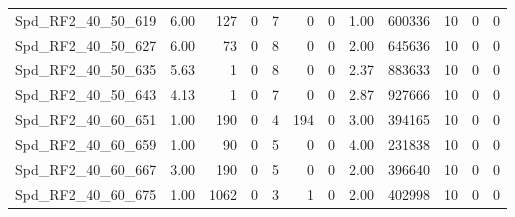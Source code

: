\begin{longtable}[c]{@{}lrrrrrrrrrrr@{}}
Spd\_RF2\_40\_50\_619        & 6.00                   & 127                     & 0                       & 7                      & 0                       & 0                       & 1.00                    & 600336                   & 10                       & 0                        & 0                        \\
Spd\_RF2\_40\_50\_627        & 6.00                   & 73                      & 0                       & 8                      & 0                       & 0                       & 2.00                    & 645636                   & 10                       & 0                        & 0                        \\
Spd\_RF2\_40\_50\_635        & 5.63                   & 1                       & 0                       & 8                      & 0                       & 0                       & 2.37                    & 883633                   & 10                       & 0                        & 0                        \\
Spd\_RF2\_40\_50\_643        & 4.13                   & 1                       & 0                       & 7                      & 0                       & 0                       & 2.87                    & 927666                   & 10                       & 0                        & 0                        \\
Spd\_RF2\_40\_60\_651        & 1.00                   & 190                     & 0                       & 4                      & 194                     & 0                       & 3.00                    & 394165                   & 10                       & 0                        & 0                        \\
Spd\_RF2\_40\_60\_659        & 1.00                   & 90                      & 0                       & 5                      & 0                       & 0                       & 4.00                    & 231838                   & 10                       & 0                        & 0                        \\
Spd\_RF2\_40\_60\_667        & 3.00                   & 190                     & 0                       & 5                      & 0                       & 0                       & 2.00                    & 396640                   & 10                       & 0                        & 0                        \\
Spd\_RF2\_40\_60\_675        & 1.00                   & 1062                    & 0                       & 3                      & 1                       & 0                       & 2.00                    & 402998                   & 10                       & 0                        & 0                        \\

\end{longtable}

